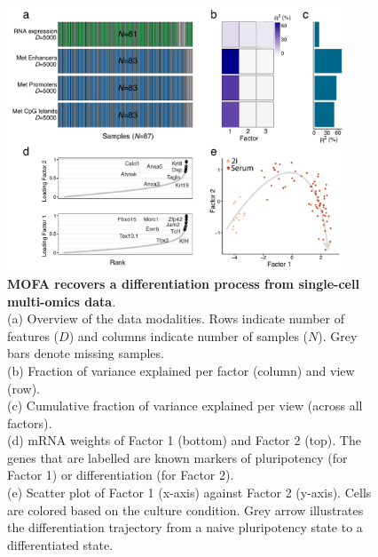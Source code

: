 \begin{figure}[H]
	\centering 	
	\includegraphics[width=0.9\textwidth]{MOFA_scMT}
	\caption{\textbf{MOFA recovers a differentiation process from single-cell multi-omics data}.\\
	(a) Overview of the data modalities. Rows indicate number of features ($D$) and columns indicate number of samples ($N$). Grey bars denote missing samples.\\
	(b) Fraction of variance explained per factor (column) and view (row).\\
	(c) Cumulative fraction of variance explained per view (across all factors).\\
	(d) mRNA weights of Factor 1 (bottom) and Factor 2 (top). The genes that are labelled are known markers of pluripotency (for Factor 1) or differentiation (for Factor 2). \\
	(e) Scatter plot of Factor 1 (x-axis) against Factor 2 (y-axis). Cells are colored based on the culture condition. Grey arrow illustrates the differentiation trajectory from a naive pluripotency state to a differentiated state. 
	}
	\label{fig:mofa_scMT}
\end{figure}



